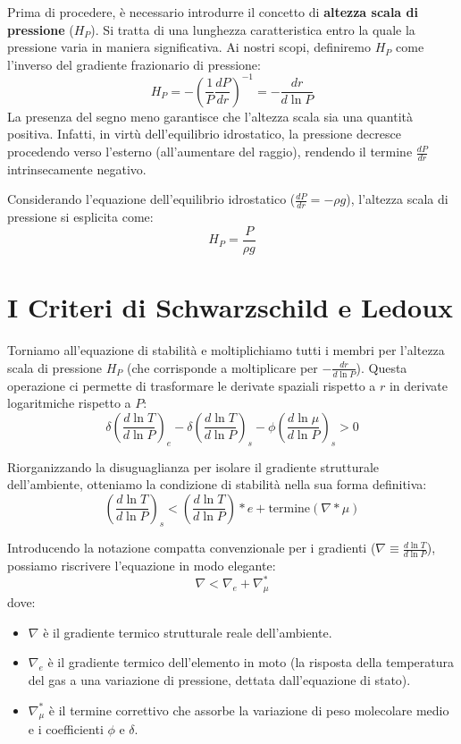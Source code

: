 Prima di procedere, è necessario introdurre il concetto di \textbf{altezza scala di pressione} ($H_P$). Si tratta di una lunghezza caratteristica entro la quale la pressione varia in maniera significativa. Ai nostri scopi, definiremo $H_P$ come l'inverso del gradiente frazionario di pressione:
\begin{equation}
H_P = - \left( \frac{1}{P} \frac{dP}{dr} \right)^{-1} = - \frac{dr}{d\ln P}
\end{equation}
La presenza del segno meno garantisce che l'altezza scala sia una quantità positiva. Infatti, in virtù dell'equilibrio idrostatico, la pressione decresce procedendo verso l'esterno (all'aumentare del raggio), rendendo il termine $\frac{dP}{dr}$ intrinsecamente negativo.

Considerando l'equazione dell'equilibrio idrostatico ($\frac{dP}{dr} = - \rho g$), l'altezza scala di pressione si esplicita come:
\begin{equation}
H_P = \frac{P}{\rho g}
\end{equation}

\section{I Criteri di Schwarzschild e Ledoux}

Torniamo all'equazione di stabilità e moltiplichiamo tutti i membri per l'altezza scala di pressione $H_P$ (che corrisponde a moltiplicare per $-\frac{dr}{d\ln P}$). Questa operazione ci permette di trasformare le derivate spaziali rispetto a $r$ in derivate logaritmiche rispetto a $P$:
\begin{equation}
\delta \left( \frac{d\ln T}{d\ln P} \right)_e - \delta \left( \frac{d\ln T}{d\ln P} \right)_s - \phi \left( \frac{d\ln \mu}{d\ln P} \right)_s > 0
\end{equation}

Riorganizzando la disuguaglianza per isolare il gradiente strutturale dell'ambiente, otteniamo la condizione di stabilità nella sua forma definitiva:
\begin{equation}
\left( \frac{d\ln T}{d\ln P} \right)_s < \left( \frac{d\ln T}{d\ln P} \right)*e + \text{termine}(\nabla*\mu)
\end{equation}

Introducendo la notazione compatta convenzionale per i gradienti ($\nabla \equiv \frac{d\ln T}{d\ln P}$), possiamo riscrivere l'equazione in modo elegante:
\begin{equation}
\nabla < \nabla_e + \nabla_\mu^*
\end{equation}
dove:
\begin{itemize}
\item \textbf{$\nabla$} è il gradiente termico strutturale reale dell'ambiente.
\item \textbf{$\nabla_e$} è il gradiente termico dell'elemento in moto (la risposta della temperatura del gas a una variazione di pressione, dettata dall'equazione di stato).
\item \textbf{$\nabla_\mu^*$} è il termine correttivo che assorbe la variazione di peso molecolare medio e i coefficienti $\phi$ e $\delta$.
\end{itemize}

